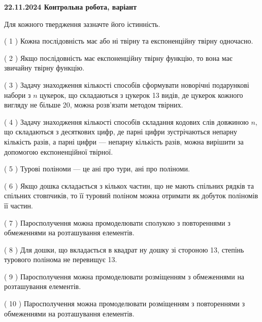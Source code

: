 \documentclass[12pt, ukrainian]{article}
\begin{document}
\vspace{4mm}
\newpage
\begin {large}

\textbf{22.11.2024 Контрольна робота, варіант  }\par


{
Для кожного твердження зазначте його істинність.\par
\vspace{2mm}
( 1 ) Кожна послідовність має або ні твірну та експоненційну твірну одночасно.%

( 2 ) Якщо послідовність має експоненційну твірну функцію, то вона має звичайну твірну функцію.%

( 3 ) Задачу знаходження кількості способів сформувати новорічні подарункові набори з $n$ цукерок, що складаються з цукерок 13 видів, де цукерок кожного вигляду не більше 20, можна розв’язати методом твірних.%

( 4 ) Задачу знаходження кількості способів складання кодових слів довжиною $n$, що складаються з десяткових цифр, де парні цифри зустрічаються непарну кількість разів, а парні цифри — непарну кількість разів, можна вирішити за допомогою експоненційної твірної.%

( 5 ) Турові поліноми --- це ані про тури, ані про поліноми.%

( 6 ) Якщо дошка складається з кількох частин, що не мають спільних рядків та спільних стовпчиків, то її туровий поліном можна отримати як добуток поліномів її частин.%

( 7 ) Паросполучення можна промоделювати сполукою з повтореннями з обмеженнями на розташування елементів.%

( 8 ) Для дошки, що вкладається в квадрат ну дошку зі стороною 13, степінь турового полінома не перевищує 13.%

( 9 ) Паросполучення можна промоделювати розміщенням з обмеженнями на розташування елементів.%

( 10 ) Паросполучення можна промоделювати розміщенням з повтореннями з обмеженнями на розташування елементів.%


\vspace{5mm}
}
\end {large}
\end{document}
